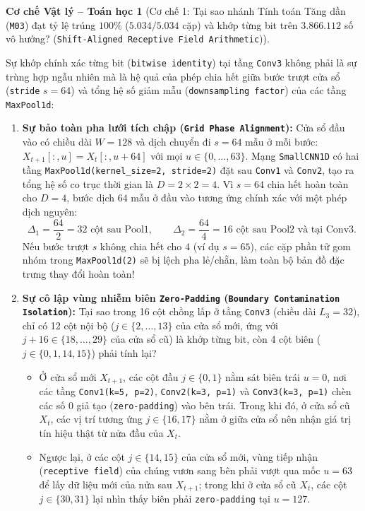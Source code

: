\documentclass[11pt,a4paper]{article}
\newcommand{\code}[1]{{\small\ttfamily\nolinkurl{#1}}}
\newtheorem{mechanism}{Cơ chế Vật lý -- Toán học}[section]
\begin{document}
\begin{mechanism}[Cơ chế 1: Tại sao nhánh Tính toán Tăng dần (\code{M03}) đạt tỷ lệ trúng $100\%$ ($5.034/5.034$ cặp) và khớp từng bit trên $3.866.112$ số vô hướng? (\code{Shift-Aligned Receptive Field Arithmetic})]
\end{mechanism}
Sự khớp chính xác từng bit (\code{bitwise identity}) tại tầng \code{Conv3} không phải là sự trùng hợp ngẫu nhiên mà là hệ quả của phép chia hết giữa bước trượt cửa sổ (\code{stride} $s=64$) và tổng hệ số giảm mẫu (\code{downsampling factor}) của các tầng \code{MaxPool1d}:
\begin{enumerate}
  \item \textbf{Sự bảo toàn pha lưới tích chập (\code{Grid Phase Alignment}):} Cửa sổ đầu vào có chiều dài $W = 128$ và dịch chuyển đi $s = 64$ mẫu ở mỗi bước: $X_{t+1}[:, u] = X_t[:, u + 64]$ với mọi $u \in \{0,\dots,63\}$. Mạng \code{SmallCNN1D} có hai tầng \code{MaxPool1d(kernel\_size=2, stride=2)} đặt sau \code{Conv1} và \code{Conv2}, tạo ra tổng hệ số co trục thời gian là $D = 2 \times 2 = 4$. Vì $s = 64$ chia hết hoàn toàn cho $D = 4$, bước dịch $64$ mẫu ở đầu vào tương ứng chính xác với một phép dịch nguyên:
  \begin{equation}
    \Delta_1 = \frac{64}{2} = 32 \text{ cột sau Pool1}, \qquad \Delta_2 = \frac{64}{4} = 16 \text{ cột sau Pool2 và tại Conv3}.
  \end{equation}
  Nếu bước trượt $s$ không chia hết cho $4$ (ví dụ $s=65$), các cặp phần tử gom nhóm trong \code{MaxPool1d(2)} sẽ bị lệch pha lẻ/chẵn, làm toàn bộ bản đồ đặc trưng thay đổi hoàn toàn!
  \item \textbf{Sự cô lập vùng nhiễm biên \code{Zero-Padding} (\code{Boundary Contamination Isolation}):} Tại sao trong 16 cột chồng lấp ở tầng \code{Conv3} (chiều dài $L_3 = 32$), chỉ có 12 cột nội bộ ($j \in \{2,\dots,13\}$ của cửa sổ mới, ứng với $j + 16 \in \{18,\dots,29\}$ của cửa sổ cũ) là khớp từng bit, còn 4 cột biên ($j \in \{0, 1, 14, 15\}$) phải tính lại?
  \begin{itemize}
    \item Ở cửa sổ mới $X_{t+1}$, các cột đầu $j \in \{0, 1\}$ nằm sát biên trái $u=0$, nơi các tầng \code{Conv1(k=5, p=2)}, \code{Conv2(k=3, p=1)} và \code{Conv3(k=3, p=1)} chèn các số $0$ giả tạo (\code{zero-padding}) vào bên trái. Trong khi đó, ở cửa sổ cũ $X_t$, các vị trí tương ứng $j \in \{16, 17\}$ nằm ở giữa cửa sổ nên nhận giá trị tín hiệu thật từ nửa đầu của $X_t$.
    \item Ngược lại, ở các cột $j \in \{14, 15\}$ của cửa sổ mới, vùng tiếp nhận (\code{receptive field}) của chúng vươn sang bên phải vượt qua mốc $u=63$ để lấy dữ liệu mới của nửa sau $X_{t+1}$; trong khi ở cửa sổ cũ $X_t$, các cột $j \in \{30, 31\}$ lại nhìn thấy biên phải \code{zero-padding} tại $u=127$.

\end{itemize}
\end{enumerate}
\end{document}
